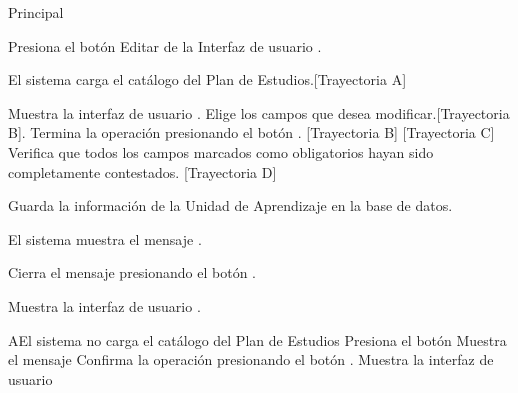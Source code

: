 \begin{UCtrayectoria}{Principal}

    \UCpaso[\UCactor] Presiona el botón Editar de la Interfaz de usuario .

    \UCpaso El sistema carga el catálogo del Plan de Estudios.[Trayectoria A]


    \UCpaso Muestra la interfaz de usuario .
    \UCpaso[\UCactor] Elige los campos que desea modificar.[Trayectoria B].
    \UCpaso[\UCactor] Termina la operación presionando el botón . [Trayectoria B] [Trayectoria C]
    \UCpaso Verifica que todos los campos marcados como obligatorios hayan sido completamente contestados. [Trayectoria D]

    \UCpaso Guarda la información de la Unidad de Aprendizaje en la base de datos.

    \UCpaso El sistema muestra el mensaje .

    \UCpaso[\UCactor] Cierra el mensaje presionando el botón .

    \UCpaso Muestra la interfaz de usuario .
\end{UCtrayectoria}


\begin{comment}
\begin{UCtrayectoriaA}{A}{El sistema no encuentra ningún formulario para mostrar.}
	\UCpaso No encuentra ningún formulario para mostrar.
    \UCpaso El sistema muestra el mensaje \MSGref{MSG9}{Por el momento no se puede realizar el registro.}.
    \UCpaso[\UCactor] Cierra el mensaje presionando el botón \IUbutton{Aceptar}.
    \UCpaso Continua en el paso 1 de la trayectoria principal del \UCref{CU1}.
\end{UCtrayectoriaA}
\end{comment}


\begin{UCtrayectoriaA}{A}{El sistema no carga el catálogo del Plan de Estudios}
	\UCpaso[\UCactor] Presiona el botón 
	\UCpaso Muestra el mensaje 
	\UCpaso[\UCactor] Confirma la operación presionando el botón .
	 \UCpaso Muestra la interfaz de usuario 

\end{UCtrayectoriaA}

